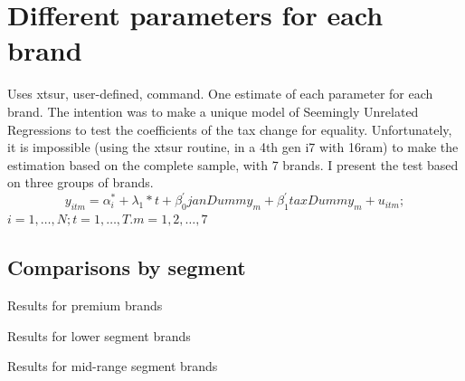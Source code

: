 \documentclass[]{article}
\begin{document}
\section{Different parameters for each brand}
Uses xtsur, user-defined, command.
One estimate of each parameter for each brand. 
The intention was to make a unique model of Seemingly Unrelated Regressions to test the coefficients of the tax change for equality. 
Unfortunately, it is impossible (using the xtsur routine, in a 4th gen i7 with 16ram) to make the estimation based on the complete sample, with 7 brands. I present the test based on three groups of brands.
\begin{equation*} 
	y_{itm}  = \alpha_{i}^{*} + \lambda_{1}*t +\beta_{0}^{'}janDummy_{m} + \beta_{1}^{'}taxDummy_{m} + u_{itm}
	;  
\end{equation*}
$i  = 1,\ldots,N;  t=1,\ldots,T. m = 1,2,\ldots,7$

\subsection{Comparisons by segment}
Results for premium brands



Results for lower segment brands



Results for mid-range segment brands


\end{document}
